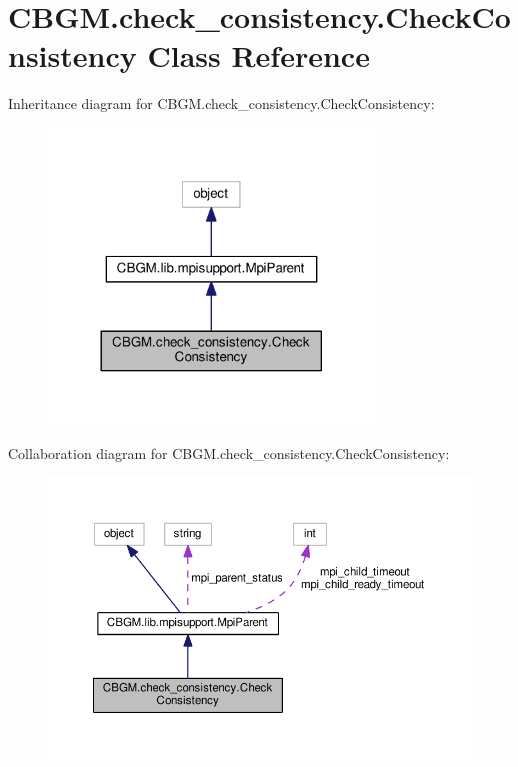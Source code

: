 \hypertarget{classCBGM_1_1check__consistency_1_1CheckConsistency}{}\section{C\+B\+G\+M.\+check\+\_\+consistency.\+Check\+Consistency Class Reference}
\label{classCBGM_1_1check__consistency_1_1CheckConsistency}


Inheritance diagram for C\+B\+G\+M.\+check\+\_\+consistency.\+Check\+Consistency\+:\nopagebreak
\begin{figure}[H]
\begin{center}
\leavevmode
\includegraphics[width=245pt]{classCBGM_1_1check__consistency_1_1CheckConsistency__inherit__graph}
\end{center}
\end{figure}


Collaboration diagram for C\+B\+G\+M.\+check\+\_\+consistency.\+Check\+Consistency\+:\nopagebreak
\begin{figure}[H]
\begin{center}
\leavevmode
\includegraphics[width=350pt]{classCBGM_1_1check__consistency_1_1CheckConsistency__coll__graph}
\end{center}
\end{figure}
